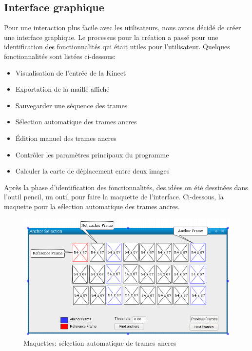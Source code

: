 \documentclass[a4paper,12pt]{article}
\begin{document}
\subsection*{Interface graphique}

Pour une interaction plus facile avec les utilisateurs, nous avons
décidé de créer une interface graphique. Le processus pour la création
a passé pour une identification des fonctionnalités qui était utiles
pour l'utilisateur. Quelques fonctionnalités sont listées ci-dessous:

\begin{itemize}
\item Visualisation de l'entrée de la Kinect 
\item Exportation de la maille affiché
\item Sauvegarder une séquence des trames
\item Sélection automatique des trames ancres
\item Édition manuel des trames ancres
\item Contrôler les paramètres principaux du programme
\item Calculer la carte de déplacement entre deux images
\end{itemize}

Après la phase d'identification des fonctionnalités, des idées on été
dessinées dans l'outil pencil\cite{Pencil}, un outil pour faire la
maquette de l'interface. 
Ci-dessous, la maquette pour la sélection automatique des trames ancres.

\begin{figure}[h!]
  \begin{center}
    \includegraphics[scale=0.4]{img/pencil.png}
    \caption{Maquettes: sélection automatique de trames ancres}
  \end{center}
\end{figure}
\end{document}
